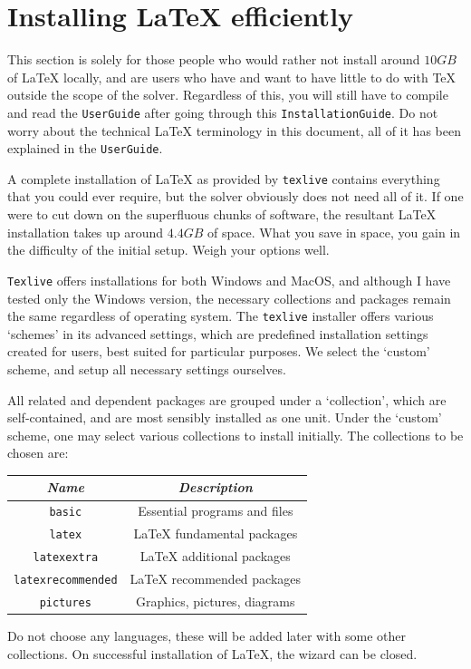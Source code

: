\documentclass[12pt,letterpaper]{article}
\newenvironment{setdef}{\def\FrameCommand{\colorbox{mathset}} \MakeFramed{\advance\hsize+\width}\begin{center}}{\end{center}\endMakeFramed}
\begin{document}
\tableofcontents\clearpage
\section{\textsf{Installing LaTeX efficiently}}
This section is solely for those people who would rather not install around $10GB$ of \LaTeX{} locally, and are users who have and want to have little to do with \TeX{} outside the scope of the solver.  Regardless of this, you will still have to compile and read the \texttt{UserGuide} after going through this \texttt{InstallationGuide}. Do not worry about the technical \LaTeX{} terminology in this document, all of it has been explained in the \texttt{UserGuide}.

A complete installation of \LaTeX{} as provided by \texttt{texlive} contains everything that you could ever require, but  the solver obviously does not  need all of it. If one were to cut down on the superfluous chunks of software, the resultant \LaTeX{} installation takes up around $4.4GB$ of space. What you save in space, you gain in the difficulty of the initial setup. Weigh your options well.

\texttt{Texlive} offers  installations for both Windows and MacOS, and although I have tested only the Windows version, the necessary collections and packages remain the same regardless of operating system. The \texttt{texlive} installer offers various `schemes' in its advanced settings, which are predefined installation settings created for users, best suited for particular purposes. We  select the `custom' scheme, and setup all necessary settings ourselves.

All related and dependent packages are grouped under a `collection', which are self-contained, and are most sensibly installed as one unit. Under the `custom' scheme, one may select various collections to install initially. The  collections to be chosen are:
\begin{setdef}
    \begin{tabular}{c|c}
        \textit{Name} & \textit{Description}\\\hline
        \texttt{basic} & Essential programs and files\\\hline
        \texttt{latex} & \LaTeX{} fundamental packages\\\hline
        \texttt{latexextra} & \LaTeX{} additional packages\\\hline
        \texttt{latexrecommended} & \LaTeX{} recommended packages\\\hline
        \texttt{pictures} & Graphics, pictures, diagrams
    \end{tabular}
\end{setdef}
Do not choose any languages, these will be added later with some other collections. On successful installation of \LaTeX{}, the wizard can be closed. 
\end{document}
